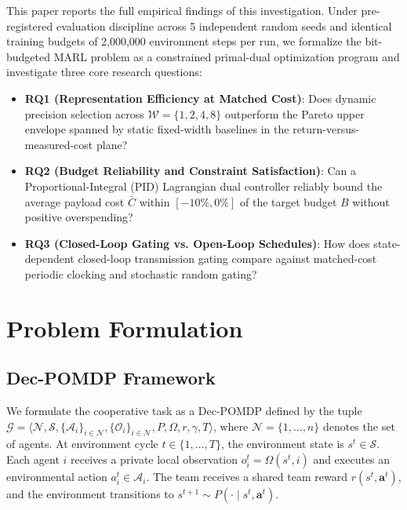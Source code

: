 \documentclass[10pt,twocolumn,letterpaper]{article}
\begin{document}
This paper reports the full empirical findings of this investigation. Under pre-registered evaluation discipline across 5 independent random seeds and identical training budgets of 2,000,000 environment steps per run, we formalize the bit-budgeted MARL problem as a constrained primal-dual optimization program and investigate three core research questions:
\begin{itemize}
    \item \textbf{RQ1 (Representation Efficiency at Matched Cost)}: Does dynamic precision selection across $\mathcal{W} = \{1, 2, 4, 8\}$ outperform the Pareto upper envelope spanned by static fixed-width baselines in the return-versus-measured-cost plane?
    \item \textbf{RQ2 (Budget Reliability and Constraint Satisfaction)}: Can a Proportional-Integral (PID) Lagrangian dual controller reliably bound the average payload cost $\bar{C}$ within $[-10\%, 0\%]$ of the target budget $B$ without positive overspending?
    \item \textbf{RQ3 (Closed-Loop Gating vs. Open-Loop Schedules)}: How does state-dependent closed-loop transmission gating compare against matched-cost periodic clocking and stochastic random gating?
\end{itemize}

\section{Problem Formulation}

\subsection{Dec-POMDP Framework}
We formulate the cooperative task as a Dec-POMDP \cite{oliehoek2016concise} defined by the tuple $\mathcal{G} = \langle \mathcal{N}, \mathcal{S}, \{\mathcal{A}_i\}_{i \in \mathcal{N}}, \{\mathcal{O}_i\}_{i \in \mathcal{N}}, P, \Omega, r, \gamma, T \rangle$, where $\mathcal{N} = \{1, \dots, n\}$ denotes the set of agents. At environment cycle $t \in \{1, \dots, T\}$, the environment state is $s^t \in \mathcal{S}$. Each agent $i$ receives a private local observation $o_i^t = \Omega(s^t, i)$ and executes an environmental action $a_i^t \in \mathcal{A}_i$. The team receives a shared team reward $r(s^t, \mathbf{a}^t)$, and the environment transitions to $s^{t+1} \sim P(\cdot \mid s^t, \mathbf{a}^t)$.
\end{document}
